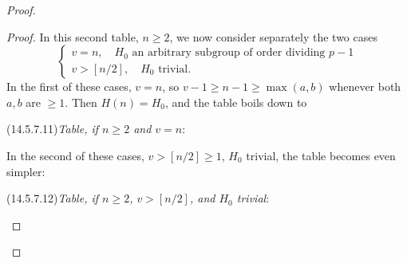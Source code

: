 \begin{proof}
\begin{proof}
In this second table, $n \ge 2$, we now consider separately the two cases
\[
\begin{cases}
v = n, \quad H_0 \text{ an arbitrary subgroup of order dividing } p-1 \\
v > [n/2], \quad H_0 \text{ trivial} .
\end{cases}
\]
In the first of these cases, $v = n$, so $v-1 \ge n-1 \ge \max(a,b)$ whenever both $a,b$ are $\ge 1$. Then $H(n) = H_0$, and the table boils down to

\par{}\noindent{}\label{item:14.5.7.11}(14.5.7.11)\enspace \emph{Table, if $n \ge 2$ and $v = n$}:
\begin{center}
\end{center}

In the second of these cases, $v > [n/2] \ge 1$, $H_0$ trivial, the table becomes even simpler:

\par{}\noindent{}\label{item:14.5.7.12}(14.5.7.12)\enspace \emph{Table, if $n \ge 2$, $v > [n/2]$, and $H_0$ trivial}:
\begin{center}
\end{center}


\end{proof}
\end{proof}
